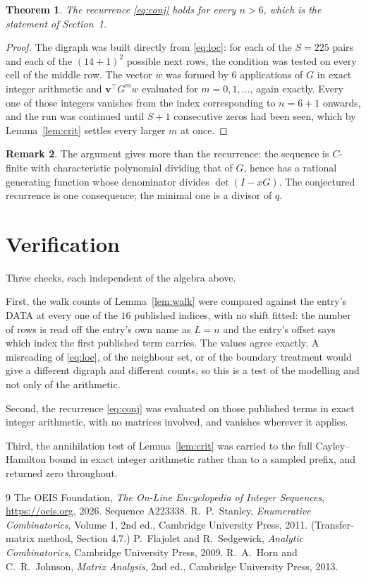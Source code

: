\documentclass[11pt,a4paper]{article}
\theoremstyle{plain}
\newtheorem{theorem}{Theorem}
\theoremstyle{definition}
\newtheorem{remark}[theorem]{Remark}
\begin{document}
\begin{theorem}
The recurrence \eqref{eq:conj} holds for every $n>6$, which is the statement of
Section~1.
\end{theorem}

\begin{proof}
The digraph was built directly from \eqref{eq:loc}: for each of the $S=225$ pairs and each
of the $(14+1)^{2}$ possible next rows, the condition was tested on every cell of
the middle row. The vector $w$ was formed by $6$ applications of $G$ in exact integer
arithmetic and $\mathbf{v}^{\!\top}G^{m}w$ evaluated for $m=0,1,\dots$, again exactly.
Every one of those integers vanishes from the index corresponding to $n=6+1$ onwards,
and the run was continued until $S+1$ consecutive zeros had been seen, which by
Lemma~\ref{lem:crit} settles every larger $m$ at once.
\end{proof}

\begin{remark}
The argument gives more than the recurrence: the sequence is $C$-finite with characteristic
polynomial dividing that of $G$, hence has a rational generating function whose denominator
divides $\det(I-xG)$. The conjectured recurrence is one consequence; the minimal one is a
divisor of $q$.
\end{remark}

\section{Verification}

Three checks, each independent of the algebra above.

First, the walk counts of Lemma~\ref{lem:walk} were compared against the entry's DATA at
every one of the $16$ published indices, with no shift fitted: the number of rows is
read off the entry's own name as $L=n$ and the entry's offset says which index the first
published term carries. The values agree exactly. A misreading of \eqref{eq:loc}, of the
neighbour set, or of the boundary treatment would give a different digraph and different
counts, so this is a test of the modelling and not only of the arithmetic.

Second, the recurrence \eqref{eq:conj} was evaluated on those published terms in exact
integer arithmetic, with no matrices involved, and vanishes wherever it applies.

Third, the annihilation test of Lemma~\ref{lem:crit} was carried to the full
Cayley--Hamilton bound in exact integer arithmetic rather than to a sampled prefix, and
returned zero throughout.

\begin{thebibliography}{9}
 The OEIS Foundation, \emph{The On-Line Encyclopedia of Integer
Sequences}, \url{https://oeis.org}, 2026. Sequence A223338.
 R.~P.~Stanley, \emph{Enumerative Combinatorics}, Volume 1, 2nd ed.,
Cambridge University Press, 2011. (Transfer-matrix method, Section 4.7.)
 P.~Flajolet and R.~Sedgewick, \emph{Analytic Combinatorics}, Cambridge
University Press, 2009.
 R.~A.~Horn and C.~R.~Johnson, \emph{Matrix Analysis}, 2nd ed., Cambridge
University Press, 2013.
\end{thebibliography}
\end{document}
